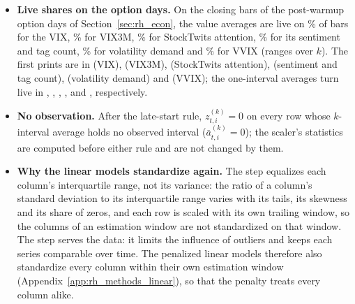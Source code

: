 \begin{itemize}
  a forecast only once a full window of live averages exists, and because the rows before that point stay at zero,
  the estimation windows of the following years hold few rows on which the series varies (none at the first such
  forecast). The availability averages are not affected.
\item \textbf{Live shares on the option days.} On the closing bars of the \rheSzDays{} post-warmup option days of
  Section~\ref{sec:rh_econ}, the value averages are live on \rhlvVixOptRange\% of bars for the VIX,
  \rhlvVixThreeOptRange\% for VIX3M, \rhlvStAttOptRange\% for StockTwits attention, \rhlvStSentOptRange\% for its
  sentiment and tag count, \rhlvVdOptRange\% for volatility demand and \rhlvVvixOptRange\% for VVIX (ranges over $k$).
  The first prints are in \rhlvVixFirst{} (VIX), \rhlvVixThreeFirst{} (VIX3M), \rhlvStAttFirst{} (StockTwits
  attention), \rhlvStSentFirst{} (sentiment and tag count), \rhlvVdFirst{} (volatility demand) and \rhlvVvixFirst{}
  (VVIX); the one-interval averages turn live in \rhlvVixLiveYear, \rhlvVixThreeLiveYear, \rhlvStAttLiveYear,
  \rhlvStSentLiveYear, \rhlvVdLiveYear{} and \rhlvVvixLiveYear{}, respectively.
\item \textbf{No observation.} After the late-start rule, $z^{(k)}_{t,i} = 0$ on every row whose $k$-interval average
  holds no observed interval ($\bar a^{(k)}_{t,i} = 0$); the scaler's statistics are computed before either rule and
  are not changed by them.
\item \textbf{Why the linear models standardize again.} The step equalizes each column's interquartile range, not its
  variance: the ratio of a column's standard deviation to its interquartile range varies with its tails, its skewness
  and its share of zeros, and each row is scaled with its own trailing window, so the columns of an estimation window
  are not standardized on that window. The step serves the data: it limits the influence of outliers and keeps each
  series comparable over time. The penalized linear models therefore also standardize every column within their own
  estimation window (Appendix~\ref{app:rh_methods_linear}), so that the penalty treats every column alike.
\end{itemize}

